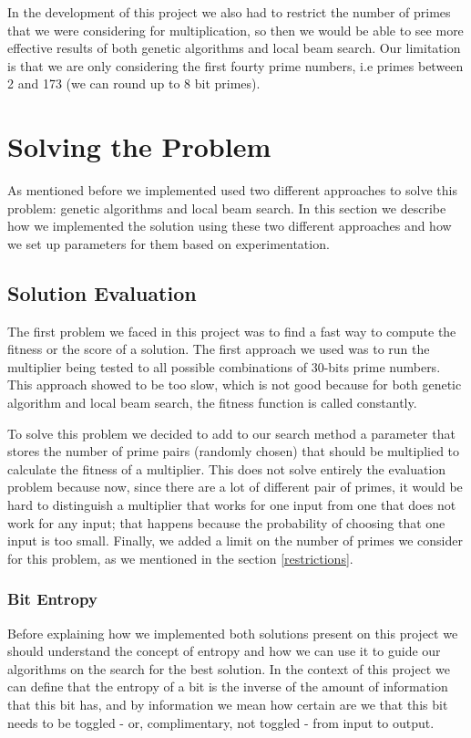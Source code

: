 \documentclass[12pt]{article}
\begin{document}
In the development of this project we also had to restrict the number of primes that we were considering for multiplication, so then we would be able to see more effective results of both genetic algorithms and local beam search. Our limitation is that we are only considering the first fourty prime numbers, i.e primes between 2 and 173 (we can round up to 8 bit primes).

\section{Solving the Problem}
As mentioned before we implemented used two different approaches to solve this problem: genetic algorithms and local beam search. In this section we describe how we implemented the solution using these two different approaches and how we set up parameters for them based on experimentation.

\subsection{Solution Evaluation}
The first problem we faced in this project was to find a fast way to compute the fitness or the score of a solution. The first approach we used was to run the multiplier being tested to all possible combinations of 30-bits prime numbers. This approach showed to be too slow, which is not good because for both genetic algorithm and local beam search, the fitness function is called constantly.

To solve this problem we decided to add to our search method a parameter that stores the number of prime pairs (randomly chosen) that should be multiplied to calculate the fitness of a multiplier. This does not solve entirely the evaluation problem because now, since there are a lot of different pair of primes, it would be hard to distinguish a multiplier that works for one input from one that does not work for any input; that happens because the probability of choosing that one input is too small. Finally, we added a limit on the number of primes we consider for this problem, as we mentioned in the section \ref{restrictions}.

\subsubsection{Bit Entropy}
\label{bit-entropy}
Before explaining how we implemented both solutions present on this project we should understand the concept of entropy and how we can use it to guide our algorithms on the search for the best solution. In the context of this project we can define that the entropy of a bit is the inverse of the amount of information that this bit has, and by information we mean how certain are we that this bit needs to be toggled - or, complimentary, not toggled - from input to output. 
\end{document}
